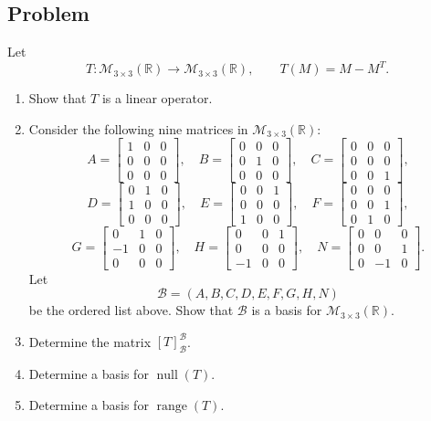 \documentclass[12pt]{article}
\newcommand{\R}{\mathbb{R}}
\newcommand{\M}{\mathcal{M}}
\newcommand{\B}{\mathcal{B}}
\newcommand{\Null}{\operatorname{null}}
\newcommand{\Range}{\operatorname{range}}
\begin{document}
\subsection{Problem}
Let
\[
T:\M_{3\times3}(\R)\to\M_{3\times3}(\R),
\qquad
T(M)=M-M^T.
\]
\begin{enumerate}[label=(\alph*)]
  \item Show that $T$ is a linear operator.
  \item Consider the following nine matrices in $\M_{3\times3}(\R)$:
  \[
  A=\begin{bmatrix}1&0&0\\0&0&0\\0&0&0\end{bmatrix},
  \quad
  B=\begin{bmatrix}0&0&0\\0&1&0\\0&0&0\end{bmatrix},
  \quad
  C=\begin{bmatrix}0&0&0\\0&0&0\\0&0&1\end{bmatrix},
  \]
  \[
  D=\begin{bmatrix}0&1&0\\1&0&0\\0&0&0\end{bmatrix},
  \quad
  E=\begin{bmatrix}0&0&1\\0&0&0\\1&0&0\end{bmatrix},
  \quad
  F=\begin{bmatrix}0&0&0\\0&0&1\\0&1&0\end{bmatrix},
  \]
  \[
  G=\begin{bmatrix}0&1&0\\-1&0&0\\0&0&0\end{bmatrix},
  \quad
  H=\begin{bmatrix}0&0&1\\0&0&0\\-1&0&0\end{bmatrix},
  \quad
  N=\begin{bmatrix}0&0&0\\0&0&1\\0&-1&0\end{bmatrix}.
  \]
  Let
  \[
  \B=(A,B,C,D,E,F,G,H,N)
  \]
  be the ordered list above. Show that $\B$ is a basis for $\M_{3\times3}(\R)$.
  \item Determine the matrix $[T]_{\B}^{\B}$.
  \item Determine a basis for $\Null(T)$.
  \item Determine a basis for $\Range(T)$.
\end{enumerate}
\end{document}
